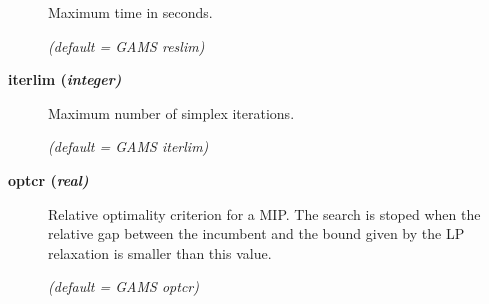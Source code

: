 \begin{description}
Maximum time in seconds.

\textsl{(default = GAMS reslim)}

\item[\label{glpkiterlim}\hypertarget{glpkiterlim}
{\textbf{iterlim (\slshape{integer})}}]\hspace{1.0in}

Maximum number of simplex iterations.

\textsl{(default = GAMS iterlim)}

\item[\label{glpkoptcr}\hypertarget{glpkoptcr}
{\textbf{optcr (\slshape{real})}}]\hspace{1.0in}

Relative optimality criterion for a MIP.
The search is stoped when the relative gap between the incumbent and the bound given by the LP relaxation is smaller than this value.

\textsl{(default = GAMS optcr)}

\end{description}
